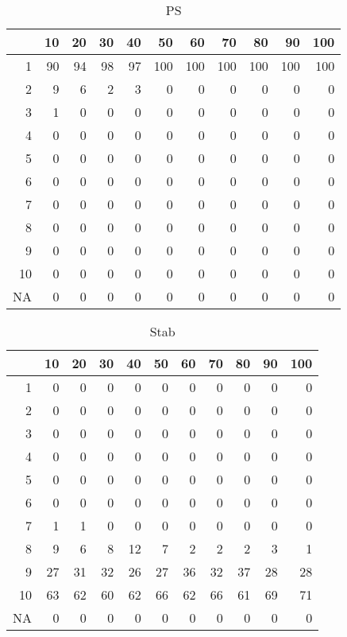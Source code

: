 \documentclass[11pt]{article}
\begin{document}
\begin{table}[H]
\centering
\begin{tabular}{rrrrrrrrrrr}
  \hline
 & 10 & 20 & 30 & 40 & 50 & 60 & 70 & 80 & 90 & 100 \\ 
  \hline
1 & 90 & 94 & 98 & 97 & 100 & 100 & 100 & 100 & 100 & 100 \\ 
  2 & 9 & 6 & 2 & 3 & 0 & 0 & 0 & 0 & 0 & 0 \\ 
  3 & 1 & 0 & 0 & 0 & 0 & 0 & 0 & 0 & 0 & 0 \\ 
  4 & 0 & 0 & 0 & 0 & 0 & 0 & 0 & 0 & 0 & 0 \\ 
  5 & 0 & 0 & 0 & 0 & 0 & 0 & 0 & 0 & 0 & 0 \\ 
  6 & 0 & 0 & 0 & 0 & 0 & 0 & 0 & 0 & 0 & 0 \\ 
  7 & 0 & 0 & 0 & 0 & 0 & 0 & 0 & 0 & 0 & 0 \\ 
  8 & 0 & 0 & 0 & 0 & 0 & 0 & 0 & 0 & 0 & 0 \\ 
  9 & 0 & 0 & 0 & 0 & 0 & 0 & 0 & 0 & 0 & 0 \\ 
  10 & 0 & 0 & 0 & 0 & 0 & 0 & 0 & 0 & 0 & 0 \\ 
  NA & 0 & 0 & 0 & 0 & 0 & 0 & 0 & 0 & 0 & 0 \\ 
   \hline
\end{tabular}
\caption{PS} 
\end{table}
\begin{table}[H]
\centering
\begin{tabular}{rrrrrrrrrrr}
  \hline
 & 10 & 20 & 30 & 40 & 50 & 60 & 70 & 80 & 90 & 100 \\ 
  \hline
1 & 0 & 0 & 0 & 0 & 0 & 0 & 0 & 0 & 0 & 0 \\ 
  2 & 0 & 0 & 0 & 0 & 0 & 0 & 0 & 0 & 0 & 0 \\ 
  3 & 0 & 0 & 0 & 0 & 0 & 0 & 0 & 0 & 0 & 0 \\ 
  4 & 0 & 0 & 0 & 0 & 0 & 0 & 0 & 0 & 0 & 0 \\ 
  5 & 0 & 0 & 0 & 0 & 0 & 0 & 0 & 0 & 0 & 0 \\ 
  6 & 0 & 0 & 0 & 0 & 0 & 0 & 0 & 0 & 0 & 0 \\ 
  7 & 1 & 1 & 0 & 0 & 0 & 0 & 0 & 0 & 0 & 0 \\ 
  8 & 9 & 6 & 8 & 12 & 7 & 2 & 2 & 2 & 3 & 1 \\ 
  9 & 27 & 31 & 32 & 26 & 27 & 36 & 32 & 37 & 28 & 28 \\ 
  10 & 63 & 62 & 60 & 62 & 66 & 62 & 66 & 61 & 69 & 71 \\ 
  NA & 0 & 0 & 0 & 0 & 0 & 0 & 0 & 0 & 0 & 0 \\ 
   \hline
\end{tabular}
\caption{Stab} 
\end{table}
\end{document}
